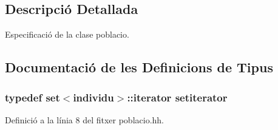 \subsection{Descripció Detallada}
Especificació de la clase poblacio. 



\subsection{Documentació de les Definicions de Tipus}
\subsubsection[{\texorpdfstring{setiterator}{setiterator}}]{\setlength{\rightskip}{0pt plus 5cm}typedef set$<${\bf individu}$>$\+::iterator {\bf setiterator}}\hypertarget{poblacio_8hh_a54fb6ab8ec9e9336d208b860dca1513d}{}\label{poblacio_8hh_a54fb6ab8ec9e9336d208b860dca1513d}


Definició a la línia 8 del fitxer poblacio.\+hh.

